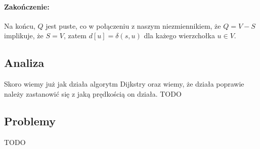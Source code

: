 \paragraph{Zakończenie:} Na końcu, $Q$ jest puste, co w połączeniu z naszym niezmiennikiem, że $Q = V - S$ implikuje,
że $S = V$, zatem $d[u] = \delta(s,u)$ dla każego wierzchołka $u \in V$.

\subsection{Analiza}

Skoro wiemy już jak działa algorytm Dijkstry oraz wiemy, że działa poprawie należy
zastanowić się z jaką prędkością on działa.
TODO
\subsection{Problemy}
TODO

